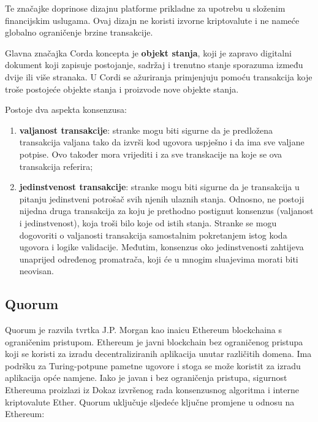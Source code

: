 \documentclass[times, utf8, diplomski]{fer}
\begin{document}
Te značajke doprinose dizajnu platforme prikladne za upotrebu u složenim  financijskim uslugama. Ovaj dizajn ne koristi izvorne kriptovalute i ne nameće globalno ograničenje brzine transakcije.

Glavna značajka Corda koncepta je \textbf{objekt stanja}, koji je zapravo digitalni dokument koji zapisuje postojanje, sadržaj i trenutno stanje sporazuma između dvije ili više stranaka. U Cordi se ažuriranja primjenjuju pomoću transakcija koje troše postojeće objekte stanja i proizvode nove objekte stanja. 

Postoje dva aspekta konsenzusa:

\begin{enumerate}

\item \textbf{valjanost transakcije}: stranke mogu biti sigurne da je predložena transakcija valjana tako da izvrši kod ugovora uspješno i da ima sve valjane potpise. Ovo također mora vrijediti i za sve transkacije na koje se ova transakcija referira;

\item \textbf{jedinstvenost transakcije}: stranke mogu biti sigurne da je transakcija u pitanju jedinstveni potrošač svih njenih ulaznih stanja. Odnosno, ne postoji nijedna druga transakcija za koju je prethodno postignut konsenzus (valjanost i jedinstvenost), koja troši bilo koje od istih stanja. Stranke se mogu dogovoriti o valjanosti transakcija samostalnim pokretanjem istog koda ugovora i logike validacije. Međutim, konsenzus oko jedinstvenosti zahtijeva unaprijed određenog promatrača,  koji će u mnogim sluajevima morati biti neovisan.

\end{enumerate}

\subsection{Quorum}

Quorum je razvila tvrtka J.P. Morgan kao inaicu Ethereum blockchaina s ograničenim pristupom. Ethereum je javni blockchain bez ograničenog pristupa koji se koristi za izradu decentraliziranih aplikacija unutar različitih domena. Ima podršku za Turing-potpune pametne ugovore i stoga se može koristit za izradu aplikacija opće namjene.  Iako je javan i bez ograničenja pristupa, sigurnost Ethereuma proizlazi iz Dokaz izvršenog rada konsenzusnog algoritma i interne kriptovalute Ether. Quorum uključuje sljedeće ključne promjene u odnosu na Ethereum:
\end{document}
